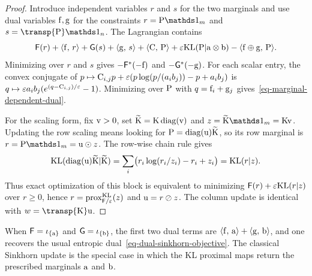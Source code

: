 \begin{proof}
Introduce independent variables $r$ and $s$ for the two marginals and use dual variables $\fD,\gD$ for the constraints $r=\P\ones_m$ and $s=\transp{\P}\ones_n$. The Lagrangian contains
\[
	\mathsf F(r)+\dotp{\fD}{r}
	+
	\mathsf G(s)+\dotp{\gD}{s}
	+
	\dotp{\C}{\P}
	+
	\epsilon\KLD(\P|\a\otimes\b)
	-
	\dotp{\fD\oplus\gD}{\P}.
\]
Minimizing over $r$ and $s$ gives $-\mathsf F^*(-\fD)$ and $-\mathsf G^*(-\gD)$. For each scalar entry, the convex conjugate of $p\mapsto \C_{i,j}p+\epsilon(p\log(p/(a_i b_j))-p+a_i b_j)$ is $q\mapsto \epsilon a_i b_j(e^{(q-\C_{i,j})/\epsilon}-1)$. Minimizing over $\P$ with $q=\fD_i+\gD_j$ gives~\eqref{eq-marginal-dependent-dual}.

For the scaling form, fix $\vD>0$, set $\widetilde{\K}=\K\diag(\vD)$ and $z=\widetilde{\K}\ones_m=\K\vD$. Updating the row scaling means looking for $\P=\diag(\uD)\widetilde{\K}$, so its row marginal is $r=\P\ones_m=\uD\odot z$. The row-wise chain rule gives
\[
	\KLD(\diag(\uD)\widetilde{\K}|\widetilde{\K})
	=
	\sum_i \bigl(r_i\log(r_i/z_i)-r_i+z_i\bigr)
	=
	\KLD(r|z).
\]
Thus exact optimization of this block is equivalent to minimizing $\mathsf F(r)+\epsilon\KLD(r|z)$ over $r\geq0$, hence $r=\prox_{\mathsf F/\epsilon}^{\KLD}(z)$ and $\uD=r\oslash z$. The column update is identical with $w=\transp{\K}\uD$.
\end{proof}

When $\mathsf F=\iota_{\{\a\}}$ and $\mathsf G=\iota_{\{\b\}}$, the first two dual terms are $\dotp{\fD}{\a}+\dotp{\gD}{\b}$, and one recovers the usual entropic dual~\eqref{eq-dual-sinkhorn-objective}. The classical Sinkhorn update is the special case in which the KL proximal maps return the prescribed marginals $\a$ and $\b$.

